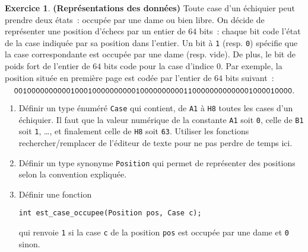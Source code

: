 \documentclass[12pt]{article}
\theoremstyle{definition}
\newtheorem{Exercice}{Exercice}
\begin{document}
\begin{Exercice} {\bf (Représentations des données)}
Toute case d'un échiquier peut prendre deux états~: occupée par une dame
ou bien libre. On décide de représenter une position d'échecs par un entier
de $64$ bits~: chaque bit code l'état de la case indiquée par sa position
dans l'entier. Un bit à {\tt 1} (resp. {\tt 0}) spécifie que la case
correspondante est occupée par une dame (resp. vide). De plus, le bit de
poids fort de l'entier de $64$ bits code pour la case d'indice $0$. Par
exemple, la position située en première page est codée par l'entier de
$64$ bits suivant~:
\begin{equation*}
{\tt 00100000 00000100 01000000 00001000 00000001 10000000 00000010 00010000}.
\end{equation*}

\begin{enumerate}
    \item Définir un type énuméré {\tt Case} qui contient, de {\tt A1} à
    {\tt H8} toutes les cases d'un échiquier. Il faut que la valeur
    numérique de la constante {\tt A1} soit {\tt 0}, celle de {\tt B1}
    soit {\tt 1}, \dots, et finalement celle de {\tt H8} soit {\tt 63}.
    Utiliser les fonctions rechercher/remplacer de l'éditeur de texte
    pour ne pas perdre de temps ici.
    \smallskip

    \item Définir un type synonyme {\tt Position} qui permet de
    représenter des positions selon la convention expliquée.
    \smallskip

    \item Définir une fonction
\begin{lstlisting}
int est_case_occupee(Position pos, Case c);
\end{lstlisting}
    qui renvoie {\tt 1} si la case {\tt c} de la position {\tt pos} est
    occupée par une dame et {\tt 0} sinon.
\end{enumerate}
\end{Exercice}
\bigskip
\end{document}
